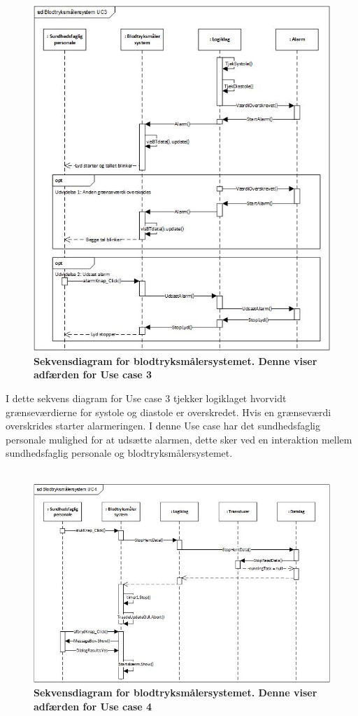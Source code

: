 \begin{figure}[H]
\includegraphics[width =1.0\textwidth , center]{billeder/sdUC3}
\caption{\textbf{Sekvensdiagram for blodtryksmålersystemet. Denne viser adfærden for Use case 3}}
\end{figure}
I dette sekvens diagram for Use case 3 tjekker logiklaget hvorvidt grænseværdierne for systole og diastole er overskredet. Hvis en grænseværdi overskrides starter alarmeringen. I denne Use case har det sundhedsfaglig personale mulighed for at udsætte alarmen, dette sker ved en interaktion mellem sundhedsfaglig personale og blodtryksmålersystemet.\\\\ 
\begin{figure}[H]
\includegraphics[width =1.0\textwidth , center]{billeder/sdUC4}
\caption{\textbf{Sekvensdiagram for blodtryksmålersystemet. Denne viser adfærden for Use case 4}}
\end{figure}
